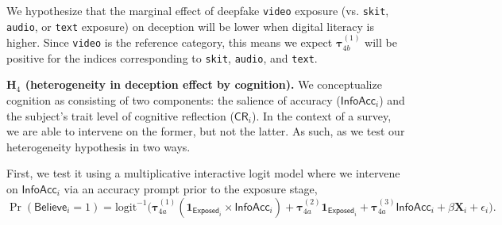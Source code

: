 \documentclass[12pt,letterpaper]{article}
\begin{document}
\noindent We hypothesize that the marginal effect of deepfake \texttt{video} exposure (vs. \texttt{skit}, \texttt{audio}, or \texttt{text} exposure) on deception will be lower when digital literacy is higher. Since \texttt{video} is the reference category, this means we expect $\bm{\tau}_{4b}^{(1)}$ will be positive for the indices corresponding to \texttt{skit}, \texttt{audio}, and \texttt{text}. %








\noindent \textbf{H$_4$ (heterogeneity in deception effect by cognition).} We conceptualize cognition as consisting of two components: the salience of accuracy ($\textsf{InfoAcc}_i$)  and the subject's trait level of cognitive reflection ($\textsf{CR}_i$). In the context of a survey, we are able to intervene on the former, but not the latter. As such, as we test our heterogeneity hypothesis in two ways.

First, we test it using a multiplicative interactive logit model where we intervene on $\textsf{InfoAcc}_i$ via an accuracy prompt prior to the exposure stage,
\begin{equation}
    \Pr(\textsf{Believe}_i=1) = \text{logit}^{-1}\Big(\bm{\tau}_{4a}^{(1)} (\mathbf{1}_{\textsf{Exposed}_i} \times \textsf{InfoAcc}_i)
    + \bm{\tau}_{4a}^{(2)}\mathbf{1}_{\textsf{Exposed}_i} + \bm{\tau}_{4a}^{(3)}\textsf{InfoAcc}_i +  \beta \mathbf{X}_i + \epsilon_i \Big).
\end{equation}
\end{document}
